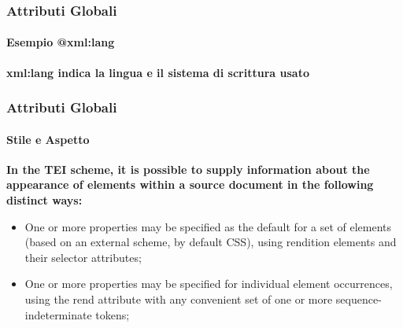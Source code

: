 \begin{frame} [fragile]
    \frametitle{Attributi Globali}
    \framesubtitle{Esempio \textrm{@xml:lang}}
    \addtocounter{nframe}{1}

    \textbf{\textrm{xml:lang} indica la lingua e il sistema di scrittura usato}
        \begin{center}
            {\langatt}
        \end{center}
\end{frame}


\begin{frame}
    \frametitle{Attributi Globali}
    \framesubtitle{Stile e Aspetto}
    \addtocounter{nframe}{1}

    
    \textbf{In the TEI scheme, it is possible to supply information about the appearance of elements within a source document in the following distinct ways:}

    \begin{itemize}
        \item One or more properties may be specified as the default for a set of elements (based on an external scheme, by default CSS), using rendition elements and their selector attributes;
        \item One or more properties may be specified for individual element occurrences, using the rend attribute with any convenient set of one or more sequence-indeterminate tokens;
    \end{itemize}
\end{frame}

